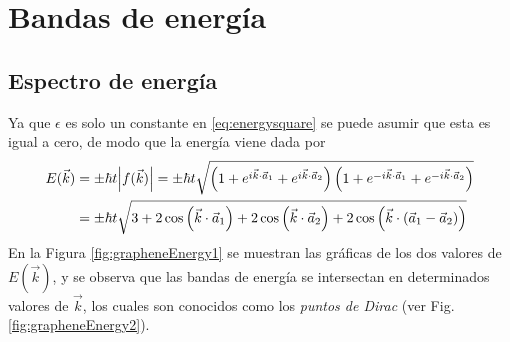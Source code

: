 \section{Bandas de energía}
\subsection{Espectro de energía}
Ya que $\epsilon$ es solo un constante en \eqref{eq:energysquare} se puede asumir que esta es igual a cero, de modo que la energía viene dada por
\begin{align}
	\nonumber E(\vec{k}) & = \pm \hbar t\abs{f(\vec{k})} = \pm \hbar t \sqrt{\left(1+e^{i \vec{k}\cdot \vec{a}_1}+e^{i \vec{k}\cdot \vec{a}_2}\right)\left(1+e^{-i \vec{k}\cdot \vec{a}_1}+e^{-i \vec{k}\cdot \vec{a}_2}\right)} \\
	                     & = \pm \hbar t \sqrt{3+2 \cos\left(\vec{k}\cdot \vec{a}_1\right)+2 \cos\left(\vec{k}\cdot \vec{a}_2\right)+2 \cos\left(\vec{k}\cdot\left(\vec{a}_1 - \vec{a}_2 \right)\right)}\label{eq:energygraphene}
\end{align}
En la Figura \ref{fig:grapheneEnergy1} se muestran las gráficas de los dos valores de $E(\vec{k})$, y se observa que las bandas de energía se intersectan en determinados valores de $\vec{k}$, los cuales son conocidos como los \emph{puntos de Dirac} (ver Fig. \ref{fig:grapheneEnergy2}).
